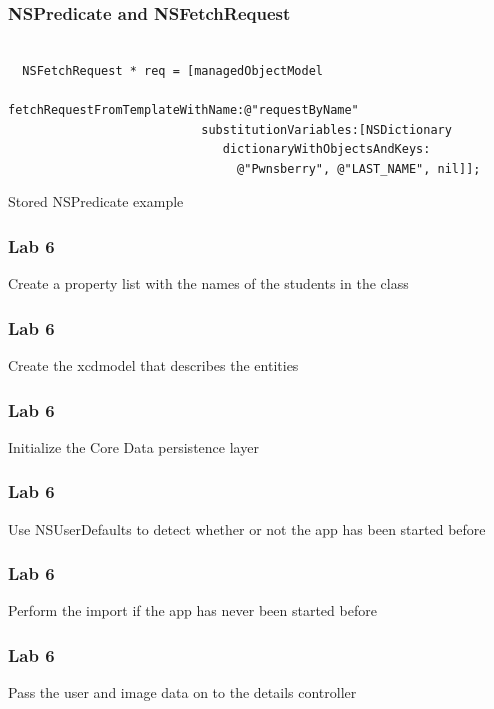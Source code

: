 \documentclass[10pt]{beamer}
\begin{document}
\begin{frame}[fragile]
  \frametitle{NSPredicate and NSFetchRequest}
  \begin{listing}[H]
    \begin{verbatim}

  NSFetchRequest * req = [managedObjectModel
                           fetchRequestFromTemplateWithName:@"requestByName"
                           substitutionVariables:[NSDictionary
                              dictionaryWithObjectsAndKeys:
                                @"Pwnsberry", @"LAST_NAME", nil]];

  \end{verbatim}
    \caption{Stored NSPredicate example}
    \label{listing:42}
  \end{listing}

\end{frame}

    
\begin{frame}[fragile]
  \frametitle{Lab 6}
  Create a property list with the names of the students in the class

\end{frame}

\begin{frame}[fragile]
  \frametitle{Lab 6}
  Create the xcdmodel that describes the entities

\end{frame}

\begin{frame}[fragile]
  \frametitle{Lab 6}
  Initialize the Core Data persistence layer

\end{frame}

\begin{frame}[fragile]
  \frametitle{Lab 6}
  Use NSUserDefaults to detect whether or not the app has been started before

\end{frame}

\begin{frame}[fragile]
  \frametitle{Lab 6}
  Perform the import if the app has never been started before

\end{frame}

\begin{frame}[fragile]
  \frametitle{Lab 6}
  Pass the user and image data on to the details controller

\end{frame}
\end{document}
